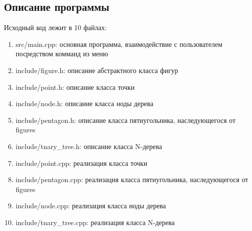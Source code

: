 \documentclass[12pt]{article}
\begin{document}
\subsection*{Описание программы}

Исходный код лежит в 10 файлах:
\begin{enumerate}
\item src/main.cpp: основная программа, взаимодействие с пользователем посредством комманд из меню

\item include/figure.h:    описание абстрактного класса фигур

\item include/point.h:     описание класса точки
\item include/node.h:  описание класса ноды дерева
\item include/pentagon.h: описание класса пятиугольника, наследующегося от figures
\item include/tnary\_tree.h:    описание класса N-дерева

\item include/point.cpp:     реализация класса точки
\item include/pentagon.cpp:  реализация класса пятиугольника, наследующегося от figures
\item include/node.cpp: реализация класса ноды дерева
\item include/tnary\_tree.cpp:    реализация класса N-дерева

\end{enumerate}
\end{document}
